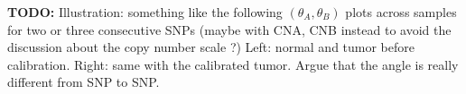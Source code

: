 \documentclass[10pt]{bmc_article}
\newenvironment{bmcformat}{\fussy\setboolean{publ}{true}}{\fussy}
\newenvironment{TODO}{\color{red}\textbf{TODO:}}{}
\begin{document}
\begin{bmcformat}
\begin{TODO}
  Illustration: something like the following $(\theta_A,\theta_B)$ plots across samples for two or three consecutive SNPs (maybe with CNA, CNB instead to avoid the discussion about the copy number scale ?) Left: normal and tumor before calibration. Right: same with the calibrated tumor. Argue that the angle is really different from SNP to SNP. 
\end{TODO}



\end{bmcformat}
\end{document}
